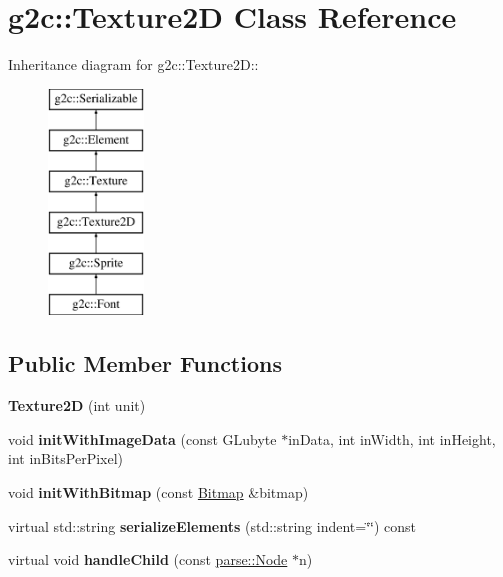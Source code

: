 \hypertarget{classg2c_1_1_texture2_d}{
\section{g2c::Texture2D Class Reference}
\label{classg2c_1_1_texture2_d}
}
Inheritance diagram for g2c::Texture2D::\begin{figure}[H]
\begin{center}
\leavevmode
\includegraphics[height=6cm]{classg2c_1_1_texture2_d}
\end{center}
\end{figure}
\subsection*{Public Member Functions}
\begin{DoxyCompactItemize}
\item 
\hypertarget{classg2c_1_1_texture2_d_ad29455116e90b411faf6d113bd9dfb3f}{
{\bfseries Texture2D} (int unit)}
\label{classg2c_1_1_texture2_d_ad29455116e90b411faf6d113bd9dfb3f}

\item 
\hypertarget{classg2c_1_1_texture2_d_a9d59a7f32d06a8335624929d607ae18e}{
void {\bfseries initWithImageData} (const GLubyte $\ast$inData, int inWidth, int inHeight, int inBitsPerPixel)}
\label{classg2c_1_1_texture2_d_a9d59a7f32d06a8335624929d607ae18e}

\item 
\hypertarget{classg2c_1_1_texture2_d_ab194586c1ed8e48f9acdc67878569fb7}{
void {\bfseries initWithBitmap} (const \hyperlink{classg2c_1_1_bitmap}{Bitmap} \&bitmap)}
\label{classg2c_1_1_texture2_d_ab194586c1ed8e48f9acdc67878569fb7}

\item 
\hypertarget{classg2c_1_1_texture2_d_a2622ef69a99eb593810332cecd78f74b}{
virtual std::string {\bfseries serializeElements} (std::string indent=\char`\"{}\char`\"{}) const }
\label{classg2c_1_1_texture2_d_a2622ef69a99eb593810332cecd78f74b}

\item 
\hypertarget{classg2c_1_1_texture2_d_a9b1bcddd36df970855242c98057f9de5}{
virtual void {\bfseries handleChild} (const \hyperlink{classparse_1_1_node}{parse::Node} $\ast$n)}
\label{classg2c_1_1_texture2_d_a9b1bcddd36df970855242c98057f9de5}

\end{DoxyCompactItemize}
